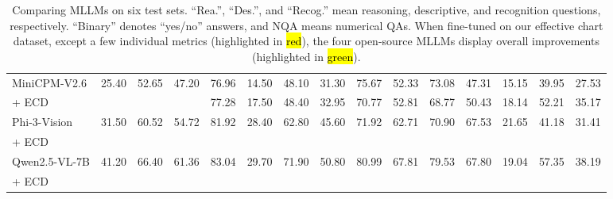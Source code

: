 \begin{table}[ht]
{\begin{tabular}{l|cccc|cccccccccc}
\rowcolor{gray!10}MiniCPM-V2.6 \cite{yao2024minicpm}  & 25.40 & 52.65 & 47.20 & 76.96 & 14.50 & 48.10 & 31.30 & 75.67 & 52.33 & 73.08 & 47.31 & 15.15 & 39.95 & 27.53\\
+ ECD  &  \cellcolor{green!8}{26.90} & \cellcolor{green!8}{61.90} & \cellcolor{green!8}{54.91} & \cellcolor{green!8}77.28 & \cellcolor{green!8}17.50 & \cellcolor{green!8}48.40 & \cellcolor{green!8}32.95 & \cellcolor{red!8}70.77 & \cellcolor{green!8}52.81 & \cellcolor{red!8}68.77 & \cellcolor{green!8}50.43 & \cellcolor{green!8}18.14 & \cellcolor{green!8}52.21 & \cellcolor{green!8}35.17 \\
\rowcolor{gray!10}Phi-3-Vision \cite{abdin2024phi}   & 31.50  & 60.52 & 54.72 & 81.92 & 28.40 & 62.80 & 45.60 & 71.92 & 62.71 & 70.90 & 67.53 & 21.65 & 41.18 & 31.41   \\
+ ECD   & \cellcolor{green!8}{33.40} & \cellcolor{green!8}{68.00} & \cellcolor{green!8}{61.08} & \cellcolor{green!8}{84.88} & \cellcolor{green!8}{32.80} & \cellcolor{green!8}{64.50} & \cellcolor{green!8}{48.65} & \cellcolor{green!8}{73.49} &  \cellcolor{green!8}{63.76} & \cellcolor{green!8}{72.41} & \cellcolor{green!8}{71.44} & \cellcolor{green!8}{29.49} & \cellcolor{green!8}{59.31} & \cellcolor{green!8}{44.40} \\
\rowcolor{gray!10}Qwen2.5-VL-7B \cite{bai2025qwen2}   & 41.20  & 66.40 & 61.36 & 83.04 & 29.70 & 71.90 & 50.80 & 80.99 & 67.81 & 79.53 & 67.80 & 19.04 & 57.35 & 38.19   \\
+ ECD   & \cellcolor{red!8}{40.20} & \cellcolor{green!8}{74.20} & \cellcolor{green!8}{67.40} & \cellcolor{green!8}{85.32} & \cellcolor{green!8}{36.20} & \cellcolor{red!8}{70.80} & \cellcolor{green!8}{53.50} & \cellcolor{red!8}{79.35} &  \cellcolor{green!8}{70.86} & \cellcolor{red!8}{78.41} & \cellcolor{green!8}{70.83} & \cellcolor{green!8}{35.38} & \cellcolor{green!8}{66.34} & \cellcolor{green!8}{50.86} \\
\bottomrule
\end{tabular}
}
\caption{
Comparing MLLMs on six test sets.
``Rea.'', ``Des.'',  and ``Recog.'' mean reasoning,  descriptive, and recognition questions, respectively.
``Binary'' denotes ``yes/no'' answers, and NQA means numerical QAs.
When fine-tuned on our effective chart dataset, except a few individual metrics (highlighted in
\hl{{red}}), the four open-source MLLMs display overall improvements (highlighted in
\hl{{green}}).
}
\label{tab:main}
\end{table}
